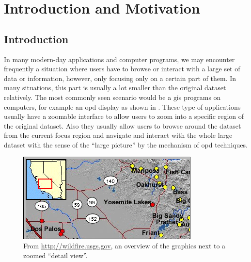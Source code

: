 
\chapter{Introduction and Motivation} %

\label{Chapter1} %


\section{Introduction}

In many modern-day applications and computer programs, we may encounter frequently a situation where users have to browse or interact with a large set of data or information, however, only focusing only on a certain part of them. In many situations, this part is usually a lot smaller than the original dataset relatively. The most commonly seen scenario would be a \gls{gis} programs on computers, for example an \gls{opd} display as shown in . These type of applications usually have a zoomable interface to allow users to zoom into a specific region of the original dataset. Also they usually allow users to browse around the dataset from the current focus region and navigate and interact with the whole large dataset with the sense of the ``large picture'' by the mechanism of \gls{opd} techniques.

\begin{figure}[th]
\centering
\includegraphics{Figures/Chapter1/usgsmap.png}
\decoRule
\caption[Overview Plus Detail on Map]{From \url{http://wildfire.usgs.gov}, an overview of the graphics next to a zoomed ``detail view''.}
\label{fig:usgsmap}
\end{figure}

